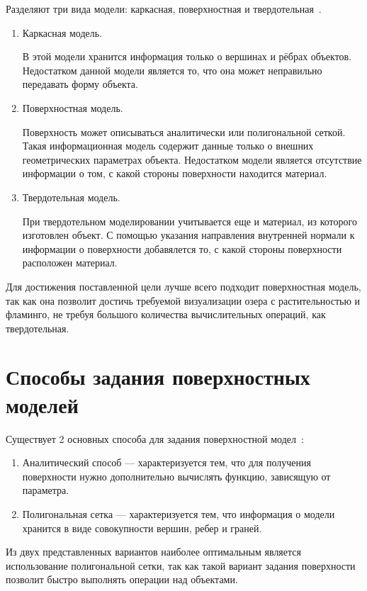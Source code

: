 Разделяют три вида модели: каркасная, поверхностная и твердотельная~\cite{kurov, roders, refl}.
\begin{enumerate}[label=\arabic*)]
	\item Каркасная модель. 
	
	В этой модели хранится информация только о вершинах и рёбрах объектов. Недостатком данной модели является то, что она может неправильно передавать форму объекта.
	\item Поверхностная модель.
	
	Поверхность может описываться аналитически или полигональной сеткой. Такая информационная модель содержит данные только о внешних геометрических параметрах объекта. Недостатком модели является отсутствие информации о том, с какой стороны поверхности находится материал.

	\item Твердотельная модель.
	
	При твердотельном моделировании учитывается еще и материал, из которого изготовлен объект.  С помощью указания направления внутренней нормали к информации о поверхности добавялется то, с какой стороны поверхности расположен материал.
\end{enumerate}

Для достижения поставленной цели лучше всего подходит поверхностная модель, так как она позволит достичь требуемой визуализации озера с растительностью и фламинго, не требуя большого количества вычислительных операций, как твердотельная. 

\section[Способы задания поверхностных моделей]{Способы задания поверхностных\\моделей}

Существует 2 основных способа для задания поверхностной модел~\cite{roders}:
\begin{enumerate}[label=\arabic*)]
	\item Аналитический способ --- характеризуется тем, что для получения поверхности нужно дополнительно вычислять функцию, зависящую от параметра.
	
	\item Полигональная сетка --- характеризуется тем, что информация о модели хранится в виде совокупности вершин, ребер и граней.
\end{enumerate}

Из двух представленных вариантов наиболее оптимальным является использование полигональной сетки, так как такой вариант задания поверхности позволит быстро выполнять операции над объектами.


